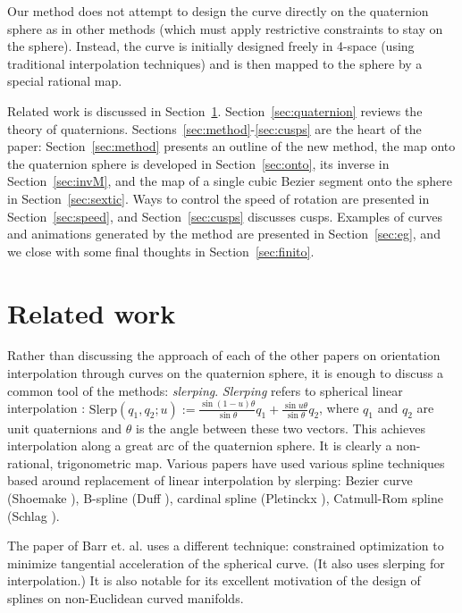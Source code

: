 Our method does not attempt to design the curve directly on the
quaternion sphere as in other methods (which must apply restrictive
constraints to stay on the sphere).
Instead, the curve is initially designed freely in 4-space
(using traditional interpolation techniques)
and is then mapped to the sphere by a special rational map.


Related work is discussed in Section~\ref{sec:related}.
Section~\ref{sec:quaternion} reviews the theory of quaternions.
Sections~\ref{sec:method}-\ref{sec:cusps} are the heart of the paper:
Section~\ref{sec:method} presents an outline of the new method,
the map onto the quaternion sphere is developed in Section~\ref{sec:onto},
its inverse in Section~\ref{sec:invM}, and the map of a single cubic Bezier
segment onto the sphere in Section~\ref{sec:sextic}.
Ways to control the speed of rotation are presented in Section~\ref{sec:speed},
and Section~\ref{sec:cusps} discusses cusps.
Examples of curves and animations generated by the method 
are presented in Section~\ref{sec:eg},
and we close with some final thoughts in Section~\ref{sec:finito}.

\section{Related work}
\label{sec:related}

Rather than discussing the approach of each of the other papers
on orientation interpolation through curves on the quaternion sphere,
it is enough to discuss a common tool of the methods: {\em slerping}.
{\em Slerping} refers to spherical linear interpolation
\cite{shoemake85}:
$\mbox{Slerp}(q_1,q_2;u) 
:= \frac{\sin (1-u) \theta}{\sin \theta} q_1 + 
   \frac{\sin u \theta}{\sin \theta} q_2$,
where $q_1$ and $q_2$ are unit quaternions and $\theta$
is the angle between these two vectors.
This achieves interpolation along a great arc of the quaternion sphere.
It is clearly a non-rational, trigonometric map.
Various papers have used various spline techniques based around replacement
of linear interpolation by slerping:
Bezier curve (Shoemake \cite{shoemake85}),
B-spline (Duff \cite{duff85}),
cardinal spline (Pletinckx \cite{pletinckx89}),
Catmull-Rom spline (Schlag \cite{schlag91}).

The paper of Barr et. al. \cite{barr92} uses a different technique:
constrained optimization to minimize
tangential acceleration of the spherical curve.
(It also uses slerping for interpolation.)
It is also notable for its excellent motivation of the
design of splines on non-Euclidean curved manifolds.

